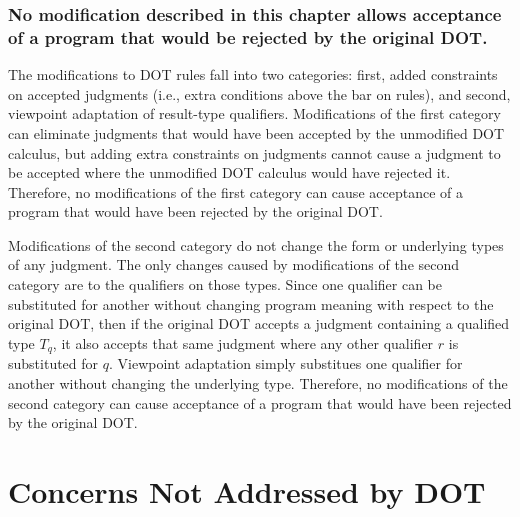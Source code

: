 \subsubsection{No modification described in this chapter allows acceptance of a program
that would be rejected by the original DOT.}
The modifications to DOT rules fall into two categories:
first, added constraints on accepted judgments (i.e., extra conditions above the bar on rules),
and second, viewpoint adaptation of result-type qualifiers.
Modifications of the first category can eliminate judgments that would have
been accepted by the unmodified DOT calculus, but adding extra constraints
on judgments cannot cause a judgment to be accepted where the unmodified DOT calculus
would have rejected it.
Therefore, no modifications of the first category can cause acceptance of a program
that would have been rejected by the original DOT.

Modifications of the second category do not change the form or underlying types
of any judgment. The only changes caused by modifications of the second category
are to the qualifiers on those types.
Since one qualifier can be substituted for another without changing program meaning
with respect to the original DOT, then if the original DOT accepts a judgment
containing a qualified type $T_q$, it also accepts that same judgment where
any other qualifier $r$ is substituted for $q$.
Viewpoint adaptation simply substitues one qualifier for another without changing
the underlying type.
Therefore, no modifications of the second category can cause acceptance
of a program that would have been rejected by the original DOT.

\begin{comment}
\subsubsection{No qualifier-related functions or operations are non-terminating.}

The viewpoint adaptation operator~$\triangleright$ and all auxiliary functions
terminate in constant time except for $env$.
Although $env$ is defined recursively, it always terminates for an input
program of finite size.

I assume here that obtaining the environment qualifier of any class label
\mbox{($env(L^c)$)} is a finite-time operation.
\mbox{$env(p.L^c)$} ...
\end{comment}

\section{Concerns Not Addressed by DOT} \label{dot-unaddressed}

